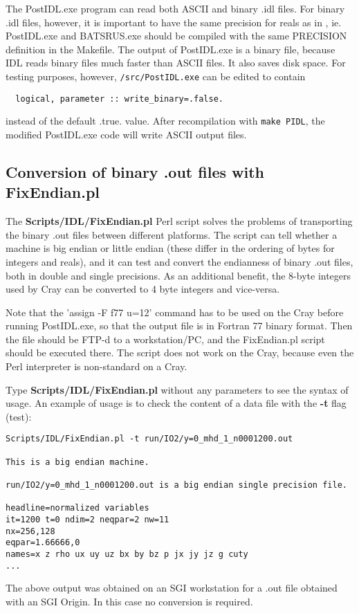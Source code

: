 The PostIDL.exe program can read both ASCII and binary .idl files. 
For binary .idl files, however, it is important to have the same
precision for reals as in \BATSRUS, ie. PostIDL.exe and BATSRUS.exe
should be compiled with the same PRECISION definition in the Makefile.
The output of PostIDL.exe is a binary file, because IDL reads
binary files much faster than ASCII files. It also saves disk space.
For testing purposes, however, {\tt /src/PostIDL.exe} can be edited to contain
\begin{verbatim}
  logical, parameter :: write_binary=.false.
\end{verbatim}
instead of the default .true. value. After recompilation with {\tt make PIDL},
the modified PostIDL.exe code will write ASCII output files. 

\subsection{Conversion of binary .out files with FixEndian.pl 
            \label{section:convert_bin}}

The {\bf Scripts/IDL/FixEndian.pl} Perl script solves the problems of 
transporting the binary .out files between different platforms.
The script can tell whether a machine is big endian or little
endian (these differ in the ordering of bytes for integers and reals),
and it can test and convert the endianness of binary .out files,
both in double and single precisions. As an additional benefit,
the 8-byte integers used by Cray can be converted to 4 byte integers
and vice-versa.

Note that the 'assign -F f77 u=12' command has to be used on the Cray 
before running PostIDL.exe, so that the output file is in Fortran 77 
binary format. Then the file should be FTP-d to a workstation/PC, and the 
FixEndian.pl script should be executed there. The script does not work on
the Cray, because even the Perl interpreter is non-standard on a Cray.

Type {\bf Scripts/IDL/FixEndian.pl} without any parameters to see the 
syntax of usage.
An example of usage is to check the content of a data file with the
{\bf -t} flag (test):
\begin{verbatim}
Scripts/IDL/FixEndian.pl -t run/IO2/y=0_mhd_1_n0001200.out

This is a big endian machine.

run/IO2/y=0_mhd_1_n0001200.out is a big endian single precision file.

headline=normalized variables
it=1200 t=0 ndim=2 neqpar=2 nw=11
nx=256,128
eqpar=1.66666,0
names=x z rho ux uy uz bx by bz p jx jy jz g cuty
...
\end{verbatim}
The above output was obtained on an SGI workstation for a .out file 
obtained with an SGI Origin. In this case no conversion is required.

